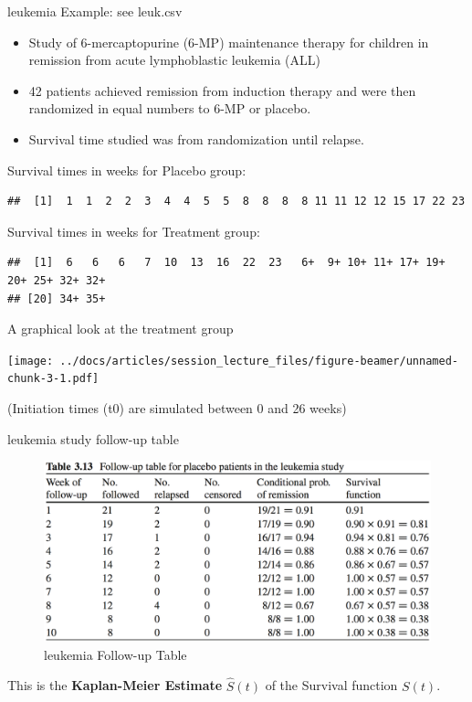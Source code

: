 \documentclass[
  ignorenonframetext,
]{beamer}
\providecommand{\tightlist}{%
  \setlength{\itemsep}{0pt}\setlength{\parskip}{0pt}}
\begin{document}
\begin{frame}[fragile]{leukemia Example: see leuk.csv}
\protect\hypertarget{leukemia-example-see-leuk.csv}{}

\begin{itemize}
\tightlist
\item
  Study of 6-mercaptopurine (6-MP) maintenance therapy for children in
  remission from acute lymphoblastic leukemia (ALL)
\item
  42 patients achieved remission from induction therapy and were then
  randomized in equal numbers to 6-MP or placebo.
\item
  Survival time studied was from randomization until relapse.
\end{itemize}

Survival times in weeks for Placebo group:

\begin{verbatim}
##  [1]  1  1  2  2  3  4  4  5  5  8  8  8  8 11 11 12 12 15 17 22 23
\end{verbatim}

Survival times in weeks for Treatment group:

\begin{verbatim}
##  [1]  6   6   6   7  10  13  16  22  23   6+  9+ 10+ 11+ 17+ 19+ 20+ 25+ 32+ 32+
## [20] 34+ 35+
\end{verbatim}

\end{frame}

\begin{frame}{A graphical look at the treatment group}
\protect\hypertarget{a-graphical-look-at-the-treatment-group}{}

\texttt{[image: ../docs/articles/session\_lecture\_files/figure-beamer/unnamed-chunk-3-1.pdf]}

(Initiation times (t0) are simulated between 0 and 26 weeks)

\end{frame}

\begin{frame}{leukemia study follow-up table}
\protect\hypertarget{leukemia-study-follow-up-table}{}

\begin{figure}
\centering
\includegraphics{figures/leukemiatable.png}
\caption{leukemia Follow-up Table}
\end{figure}

This is the \textbf{Kaplan-Meier Estimate} \(\hat S(t)\) of the Survival
function \(S(t)\).

\end{frame}
\end{document}
